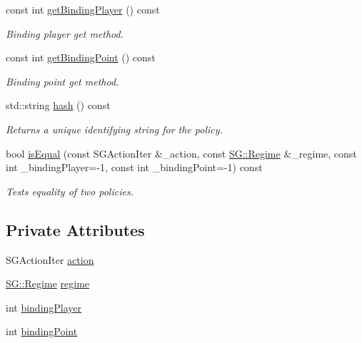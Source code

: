 \begin{DoxyCompactItemize}
const int \hyperlink{classSGPolicy_aa0c3081c030f86b58d843e0b5ba21ba9}{get\+Binding\+Player} () const
\begin{DoxyCompactList}\small\item\em Binding player get method. \end{DoxyCompactList}\item 
\mbox{\label{classSGPolicy_aee9094f10fd8e15ac972528160a00ae1}} 
const int \hyperlink{classSGPolicy_aee9094f10fd8e15ac972528160a00ae1}{get\+Binding\+Point} () const
\begin{DoxyCompactList}\small\item\em Binding point get method. \end{DoxyCompactList}\item 
\mbox{\label{classSGPolicy_a379522cfa56e755fc666050e51021a05}} 
std\+::string \hyperlink{classSGPolicy_a379522cfa56e755fc666050e51021a05}{hash} () const
\begin{DoxyCompactList}\small\item\em Returns a unique identifying string for the policy. \end{DoxyCompactList}\item 
\mbox{\label{classSGPolicy_ac0878f9985f875caf3ff2bd728c42d4c}} 
bool \hyperlink{classSGPolicy_ac0878f9985f875caf3ff2bd728c42d4c}{is\+Equal} (const S\+G\+Action\+Iter \&\+\_\+action, const \hyperlink{namespaceSG_a139e4dec41ea0f38aae1f93f60cfff60}{S\+G\+::\+Regime} \&\+\_\+regime, const int \+\_\+binding\+Player=-\/1, const int \+\_\+binding\+Point=-\/1) const
\begin{DoxyCompactList}\small\item\em Tests equality of two policies. \end{DoxyCompactList}\end{DoxyCompactItemize}
\subsection*{Private Attributes}
\begin{DoxyCompactItemize}
\item 
S\+G\+Action\+Iter \hyperlink{classSGPolicy_ac029ee78aaba722161e90c5709aa73c2}{action}
\item 
\hyperlink{namespaceSG_a139e4dec41ea0f38aae1f93f60cfff60}{S\+G\+::\+Regime} \hyperlink{classSGPolicy_a4e83ce41ec77a683e43f612f3579bd97}{regime}
\item 
int \hyperlink{classSGPolicy_a1ff371b21f81c60ca360c28ed62d934d}{binding\+Player}
\item 
int \hyperlink{classSGPolicy_afcf15ede93b8107513712a58c501bffe}{binding\+Point}
\end{DoxyCompactItemize}
